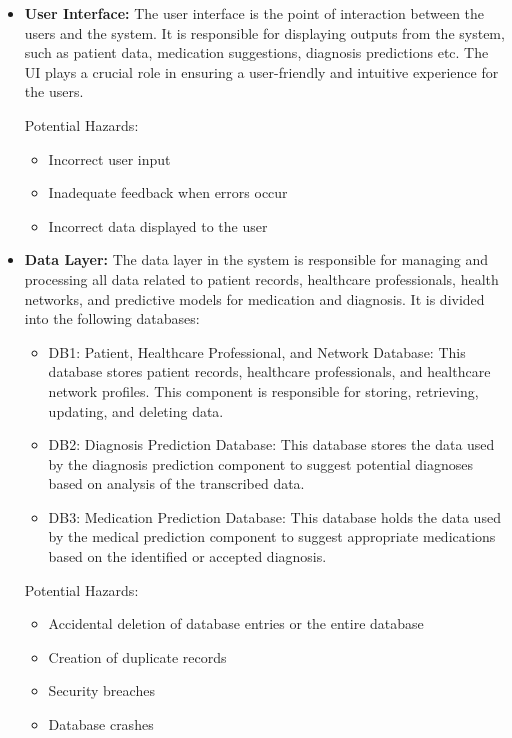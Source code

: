 \documentclass{article}
\begin{document}
\begin{itemize}
 
    \item \textbf{User Interface:}
    The user interface is the point of interaction between the users and the system. It is responsible for displaying outputs from the system, such as patient data, medication suggestions, diagnosis predictions etc. The UI plays a crucial role in ensuring a user-friendly and intuitive experience for the users.
    
    Potential Hazards:
    \begin{itemize}
        \item Incorrect user input
        \item Inadequate feedback when errors occur
        \item Incorrect data displayed to the user
    \end{itemize}

    \item \textbf{Data Layer:}
    The data layer in the system is responsible for managing and processing all data related to patient records, healthcare professionals, health networks, and predictive models for medication and diagnosis. It is divided into the following databases:
    \begin{itemize}
        \item DB1: Patient, Healthcare Professional, and Network Database: This database stores patient records, healthcare professionals, and healthcare network profiles. This component is responsible for storing, retrieving, updating, and deleting data. 

        \item DB2: Diagnosis Prediction Database: This database stores the data used by the diagnosis prediction component to suggest potential diagnoses based on analysis of the transcribed data.

        \item DB3: Medication Prediction Database: This database holds the data used by the medical prediction component to suggest appropriate medications based on the identified or accepted diagnosis.
    \end{itemize}

    Potential Hazards:
    \begin{itemize}
        \item Accidental deletion of database entries or the entire database
        \item Creation of duplicate records
        \item Security breaches
        \item Database crashes   
    \end{itemize}
    

\end{itemize}
\end{document}
